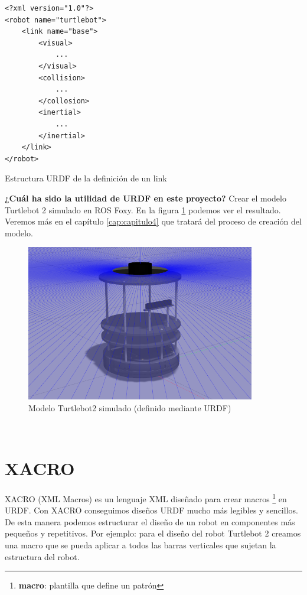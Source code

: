 \begin{code}[H]
\begin{lstlisting}
<?xml version="1.0"?>
<robot name="turtlebot">
	<link name="base">
		<visual>
			...
		</visual>
		<collision>
			...
		</collosion>
		<inertial>
			...
		</inertial>
	</link>
</robot>
\end{lstlisting}
\caption[Estructura URDF de la definicion de un link]{Estructura URDF de la definición de un link}
\label{cod:estructura_urdf}
\end{code}

\textbf{¿Cuál ha sido la utilidad de URDF en este proyecto?} Crear el modelo Turtlebot 2 simulado en ROS Foxy. En la figura \ref{fig:modelo_turtlebot2_simulado} podemos ver el resultado. Veremos más en el capítulo \ref{cap:capitulo4} que tratará del proceso de creación del modelo.
\begin{figure} [H]
  \begin{center}
    \includegraphics[width=10cm]{imagenes/turtlebot2-sim.png}
  \end{center}
  \caption{Modelo Turtlebot2 simulado (definido mediante URDF)}
  \label{fig:modelo_turtlebot2_simulado}
\end{figure}\




\section{XACRO}
\label{sec:xacro}

XACRO (XML Macros) es un lenguaje XML diseñado para crear macros \footnote{\textbf{macro}: plantilla que define un patrón} en URDF. Con XACRO conseguimos diseños URDF mucho más legibles y sencillos. De esta manera podemos estructurar el diseño de un robot en componentes más pequeños y repetitivos. Por ejemplo: para el diseño del robot Turtlebot 2 creamos una macro que se pueda aplicar a todos las barras verticales que sujetan la estructura del robot.\\

